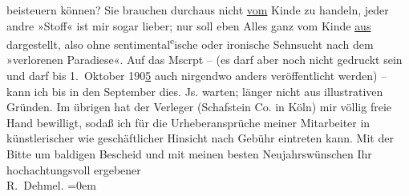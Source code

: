 \begin{ledgroupsized}[t]{13cm}
                    beisteuern können? Sie brauchen durchaus nicht \uline{vom} Kinde zu handeln, jeder andre »Stoff« ist mir sogar lieber; nur
                    soll eben Alles ganz vom Kinde \uline{aus} dargestellt,
                    also ohne sentimental\substVorne{}\textsuperscript{e}\substDazwischen{}ische\substHinten{} oder ironische Sehnsucht nach dem »verlorenen Paradiese«. Auf das
                    Mscrpt – (es darf aber noch nicht gedruckt sein und darf bis 1. Oktober
                            190\uline{5} auch nirgendwo anders veröffentlicht werden) – kann ich bis in den
                        September dies. Js. warten; länger {\pb}nicht aus illustrativen Gründen. Im übrigen hat der Verleger (Schafstein {\kaufmannsund} Co. in Köln) mir völlig freie Hand bewilligt, sodaß
                    ich für die Urheberansprüche meiner Mitarbeiter in künstlerischer wie
                    geschäftlicher Hinsicht nach Gebühr eintreten kann.\pend
           \pstart
           Mit der Bitte um baldigen Bescheid und mit meinen besten Neujahrswünschen\pend
           \pstart
           Ihr hochachtungsvoll ergebener{\\[\baselineskip]}\spacefill\mbox{R. Dehmel.}\pend
           \leftskip=0em{}\endnumbering{}\end{ledgroupsized}  \newcommand{\dateiname}{L01194}\newcommand{\titel}{Richard Dehmel an Arthur Schnitzler, 1. 1. 1902}\newcommand{\editorInnen}{ Martin Anton Müller und Gerd-Hermann Susen}
      